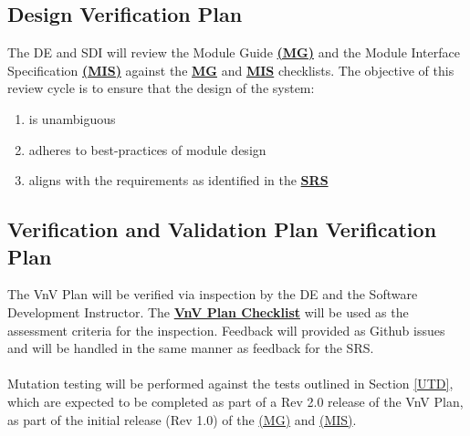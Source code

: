 \documentclass[12pt, titlepage]{article}
\begin{document}
\subsection{Design Verification Plan}
The DE and SDI will review the Module Guide 
\textbf{\href{https://github.com/KiranSingh15/CAS-741-Image-Correspondences/blob/main/docs/Design/SoftArchitecture/MG.pdf}
{(MG)}} and the Module Interface Specification 
\textbf{\href{https://github.com/KiranSingh15/CAS-741-Image-Correspondences/blob/main/docs/Design/SoftDetailedDes/MIS.pdf}
{(MIS)}} against the 
\textbf{\href{https://github.com/KiranSingh15/CAS-741-Image-Correspondences/blob/main/docs/Checklists/MG-Checklist.pdf}
{MG}} and
\textbf{\href{https://github.com/KiranSingh15/CAS-741-Image-Correspondences/blob/main/docs/Checklists/MIS-Checklist.pdf}
{MIS}} checklists. The objective of this review cycle is to ensure that the design of the system:
\begin{enumerate}
\item is unambiguous
\item adheres to best-practices of module design
\item aligns with the requirements as identified in the 
\textbf{\href{https://github.com/KiranSingh15/CAS-741-Image-Correspondences/blob/main/docs/SRS/SRS.pdf}
{SRS}}
\end{enumerate}


\subsection{Verification and Validation Plan Verification Plan}
The VnV Plan will be verified via inspection by the DE and the 
Software Development Instructor. The 
\textbf{\href{https://github.com/KiranSingh15/CAS-741-Image-Correspondences/blob/main/docs/Checklists/SRS-Checklist.pdf}
{VnV Plan Checklist}} 
will be used as the assessment criteria for the inspection. 
Feedback will provided as Github issues and will be handled in the same manner as feedback 
for the SRS.\\ \\
Mutation testing will be performed against the tests outlined in Section \ref{UTD}, which are expected to be 
completed as part of a Rev 2.0 release of the VnV Plan, as part of the initial release (Rev 1.0) of the 
{\href{https://github.com/KiranSingh15/CAS-741-Image-Correspondences/blob/main/docs/Design/SoftArchitecture/MG.pdf}
{(MG)}} and 
{\href{https://github.com/KiranSingh15/CAS-741-Image-Correspondences/blob/main/docs/Design/SoftDetailedDes/MIS.pdf}
{(MIS)}}.
\end{document}
